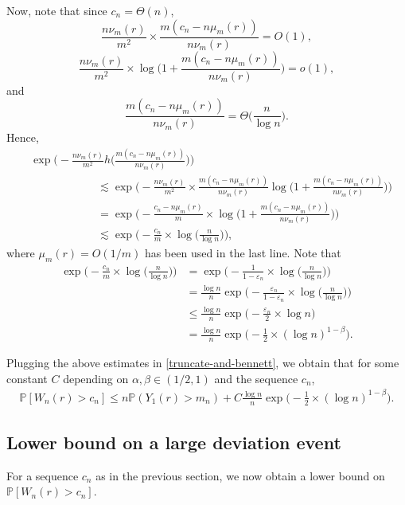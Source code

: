 \documentclass[9pt,a4paper,reqno]{amsart}
\theoremstyle{mine}
\theoremstyle{definition}
\theoremstyle{remark}
\renewcommand\epsilon{\varepsilon}
\newcommand{\mb}{\mathbb}
\begin{document}
Now, note that since $c_n = \Theta(n)$, 
\[ \frac{n \nu_m(r) }{m^2 } \times \frac{m(c_n- n \mu_m(r))}{n \nu_m(r) } = O(1),\]
\[\frac{n \nu_m(r) }{m^2 } \times \log \biggl( 1 +  \frac{m(c_n- n \mu_m(r))}{n \nu_m(r) }\biggr) = o(1),\]
and 
\[ \frac{m(c_n- n \mu_m(r))}{n \nu_m(r) } = \Theta\biggl( \frac{n}{\log n}\biggr).\]
Hence, 
\begin{align}
  &\exp\biggl( - \frac{n \nu_m(r) }{m^2 } h\biggl(\frac{m(c_n- n \mu_m(r))}{n \nu_m(r) }\biggr)\biggr) \\ & \qquad\qquad \qquad\lesssim \exp\biggl( - \frac{n \nu_m(r) }{m^2 }\times \frac{m(c_n- n \mu_m(r))}{n \nu_m(r) } \log\biggl(1+ \frac{m(c_n- n \mu_m(r))}{n \nu_m(r) }\biggr)\biggr) \nonumber \\
    & \qquad\qquad \qquad=\exp\biggl( - \frac{c_n- n \mu_m(r)}{m}\times\log\biggl(1+ \frac{m(c_n- n \mu_m(r))}{n \nu_m(r) }\biggr)\biggr) \nonumber \\
    & \qquad\qquad \qquad\lesssim \exp\biggl( - \frac{c_n}{m}\times\log\biggl(\frac{n}{\log n}\biggr) \biggr) \nonumber,
    \end{align}
    where  $\mu_m(r) = O(1/m)$ has been used in the last line. Note that 
\begin{align}
    \exp\biggl( - \frac{c_n}{m}\times\log\biggl(\frac{n}{\log n}\biggr)\biggr) &= \exp\biggl( - \frac{1}{1-\epsilon_n}\times\log\biggl(\frac{n}{\log n}\biggr)\biggr) \nonumber\\
    &= \frac{\log n}{n}\exp\biggl( - \frac{\epsilon_n}{1-\epsilon_n}\times\log\biggl(\frac{n}{\log n}\biggr)\biggr) \nonumber\\
    & \leq \frac{\log n}{n}\exp\biggl(-\frac{\epsilon_n}{2}\times\log n \biggr) \nonumber\\
    & =\frac{\log n}{n}\exp\biggl(-\frac{1}{2}\times(\log n)^{1-\beta} \biggr).\nonumber
\end{align}

Plugging the above estimates in \eqref{truncate-and-bennett}, we obtain that for some constant $C$ depending on $\alpha, \beta \in (1/2, 1)$ and the sequence $c_n$, 
\begin{align}\label{crux-upper}
    \mb{P}[W_n(r) > c_n] \leq n \mb{P} (Y_1(r) > m_n)+ C \frac{\log n}{n}\exp\biggl(-\frac{1}{2}\times(\log n)^{1-\beta} \biggr). 
\end{align}

\subsection{Lower bound on a large deviation event}
For a sequence $c_n$ as in the previous section, we now obtain a lower bound on $\mb{P}[W_n(r) > c_n]$.\\
\end{document}

